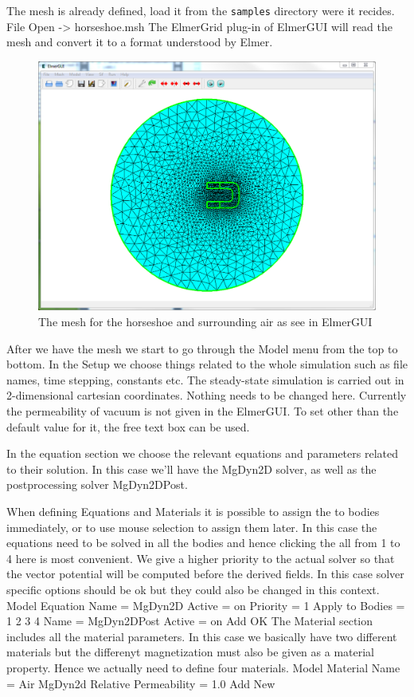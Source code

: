 The mesh is already defined, load it from the \texttt{samples} directory were it recides.
\ttbegin
File 
  Open -> horseshoe.msh
\ttend
The ElmerGrid plug-in of ElmerGUI will read the mesh and convert it to a format understood by Elmer. 

\begin{figure}[h]
\centering
\includegraphics[width=140mm]{HorseShoeMesh}
\caption{The mesh for the horseshoe and surrounding air as see in ElmerGUI}\label{fg:horseshoeselmergui}
\end{figure}  


After we have the mesh we start to go through the Model menu from the top to bottom. 
In the Setup we choose things related to the whole simulation such as file names, 
time stepping, constants etc.
The steady-state simulation is carried out in 2-dimensional cartesian
coordinates. Nothing needs to be changed here. Currently the permeability of vacuum is not given
in the ElmerGUI. To set other than the default value for it, the free text box can be used. 

In the equation section we choose the relevant equations and parameters related to their solution. 
In this case we'll have the MgDyn2D solver, as well as the postprocessing solver MgDyn2DPost.

When defining Equations and Materials it is possible to assign the to bodies immediately, or to use mouse
selection to assign them later. In this case the equations need to be solved in all the bodies and 
hence clicking the all from 1 to 4 here is most convenient. We give a higher priority to the actual solver
so that the vector potential will be computed before the derived fields. 
In this case solver specific options should be ok but they could also be changed in this context.
\ttbegin
Model
  Equation
    Name = MgDyn2D
      Active = on
      Priority = 1
      Apply to Bodies = 1 2 3 4 
    Name = MgDyn2DPost
      Active = on
    Add 
    OK
\ttend        
The Material section includes all the material parameters. In this case we basically have two 
different materials but the differenyt magnetization must also be given as a material property.
Hence we actually need to define four materials.  
\ttbegin
Model
  Material
    Name = Air
    MgDyn2d
      Relative Permeability = 1.0
    Add
    New

